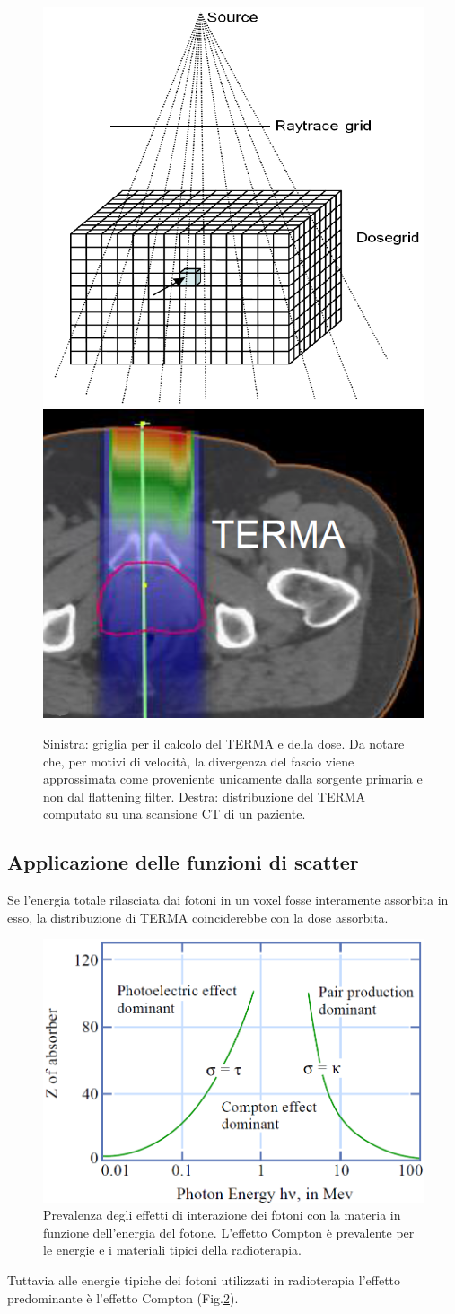 {\begin{figure}
\centering
\includegraphics[width=.4\textwidth]{./cap1/terma_1.png}
\includegraphics[width=.5\textwidth]{./cap1/terma_2.png}
\caption{Sinistra: griglia per il calcolo del TERMA e della dose. Da notare che, per motivi di velocità, la divergenza del fascio viene approssimata come proveniente unicamente dalla sorgente primaria e non dal flattening filter. Destra: distribuzione del TERMA computato su una scansione CT di un paziente.}
\label{fig:terma}
\end{figure}

\subsection{Applicazione delle funzioni di scatter}
\label{sec:scatter_fun}
Se l'energia totale rilasciata dai fotoni in un voxel fosse interamente assorbita in esso, la distribuzione di TERMA coinciderebbe con la dose assorbita.\\
\begin{figure}
\centering
\includegraphics[width=.7\textwidth]{./cap1/compt_dom.png}
\caption{Prevalenza degli effetti di interazione dei fotoni con la materia in funzione dell'energia del fotone. L'effetto Compton è prevalente per le energie e i materiali tipici della radioterapia.}
\label{fig:compt_dom}
\end{figure}
Tuttavia alle energie tipiche dei fotoni utilizzati in radioterapia l'effetto predominante è l'effetto Compton (Fig.\ref{fig:compt_dom}).

}
